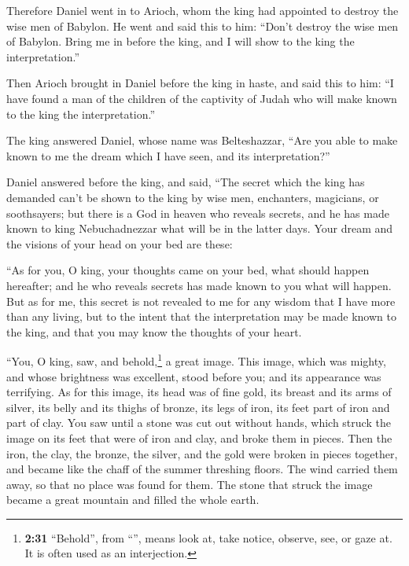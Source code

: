  Therefore Daniel went in to Arioch, whom the king had
appointed to destroy the wise men of Babylon. He went and said this to
him: ``Don't destroy the wise men of Babylon. Bring me in before the
king, and I will show to the king the interpretation.''

 Then Arioch brought in Daniel before the king in haste,
and said this to him: ``I have found a man of the children of the
captivity of Judah who will make known to the king the interpretation.''

 The king answered Daniel, whose name was Belteshazzar,
``Are you able to make known to me the dream which I have seen, and its
interpretation?''

 Daniel answered before the king, and said, ``The secret
which the king has demanded can't be shown to the king by wise men,
enchanters, magicians, or soothsayers;  but there is a
God in heaven who reveals secrets, and he has made known to king
Nebuchadnezzar what will be in the latter days. Your dream and the
visions of your head on your bed are these:

 ``As for you, O king, your thoughts came on your bed,
what should happen hereafter; and he who reveals secrets has made known
to you what will happen.  But as for me, this secret is
not revealed to me for any wisdom that I have more than any living, but
to the intent that the interpretation may be made known to the king, and
that you may know the thoughts of your heart.

 ``You, O king, saw, and behold,\footnote{\textbf{2:31}
  ``Behold'', from ``'', means look at, take notice,
  observe, see, or gaze at. It is often used as an interjection.} a
great image. This image, which was mighty, and whose brightness was
excellent, stood before you; and its appearance was terrifying.
 As for this image, its head was of fine gold, its breast
and its arms of silver, its belly and its thighs of bronze,
 its legs of iron, its feet part of iron and part of
clay.  You saw until a stone was cut out without hands,
which struck the image on its feet that were of iron and clay, and broke
them in pieces.  Then the iron, the clay, the bronze, the
silver, and the gold were broken in pieces together, and became like the
chaff of the summer threshing floors. The wind carried them away, so
that no place was found for them. The stone that struck the image became
a great mountain and filled the whole earth.

